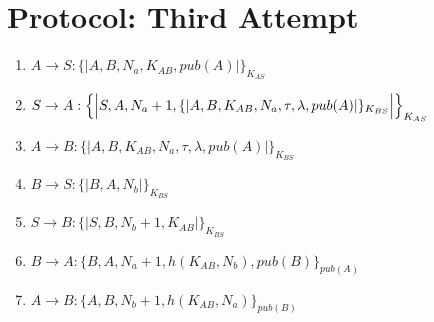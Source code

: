 \section{Protocol: Third Attempt}

\begin{enumerate}
    \item $ A \rightarrow S : \{|A, B, N_a, K_{AB}, pub(A)|\}_{K_{AS}}$
    \item $ S \rightarrow A : \Bigl\{\Bigl|S,A, N_a + 1, \{|A,B,K_{AB},N_a, \tau, \lambda, pub(A) |\}_{K_{BS}}\Bigr|\Bigr\}_{K_{AS}}$
    \item $ A \rightarrow B : \{|A,B,K_{AB},N_a, \tau, \lambda, pub(A) |\}_{K_{BS}}$
    \item $ B \rightarrow S : \{|B, A, N_b|\}_{K_{BS}}$
    \item $ S \rightarrow B : \{|S, B, N_b + 1, K_{AB}|\}_{K_{BS}}$
    \item $ B \rightarrow A : \{B, A, N_a+1, h(K_{AB}, N_b), pub(B)\}_{pub(A)}$
    \item $ A \rightarrow B : \{A, B, N_b+1, h(K_{AB}, N_a)\}_{pub(B)}$

\end{enumerate}